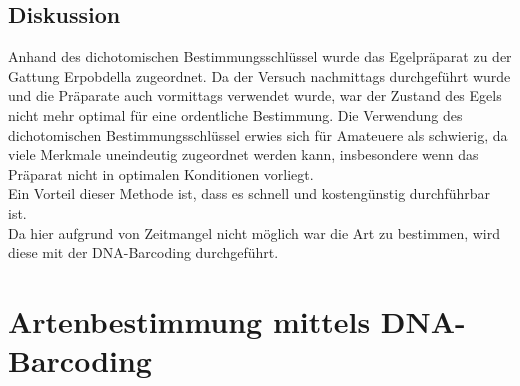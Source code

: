 \documentclass[oneside,10pt,a4paper]{report}
\begin{document}
			\subsection{Diskussion}
				Anhand des dichotomischen Bestimmungsschlüssel wurde das Egelpräparat zu der Gattung Erpobdella zugeordnet.
				Da der Versuch nachmittags durchgeführt wurde und die Präparate auch vormittags verwendet wurde, war der Zustand des Egels nicht mehr optimal für eine ordentliche Bestimmung.
				Die Verwendung des dichotomischen Bestimmungsschlüssel erwies sich für Amateuere als schwierig, da viele Merkmale uneindeutig zugeordnet werden kann, insbesondere wenn das Präparat nicht in optimalen Konditionen vorliegt.\\
				Ein Vorteil dieser Methode ist, dass es schnell und kostengünstig durchführbar ist.\\
				Da hier aufgrund von Zeitmangel nicht möglich war die Art zu bestimmen, wird diese mit der DNA-Barcoding durchgeführt.
		
		\section{Artenbestimmung mittels DNA-Barcoding}
\end{document}
